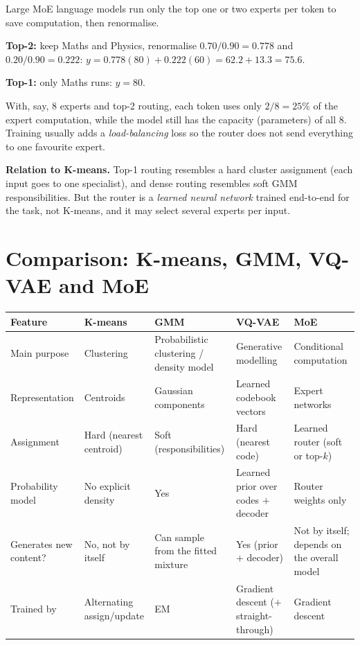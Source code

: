 \documentclass[11pt,a4paper]{article}
\begin{document}
\begin{example}
Large MoE language models run only the top one or two experts per token to save computation, then renormalise.

\textbf{Top-2:} keep Maths and Physics, renormalise $0.70/0.90=0.778$ and $0.20/0.90=0.222$:
$y=0.778(80)+0.222(60)=62.2+13.3=\mathbf{75.6}$.

\textbf{Top-1:} only Maths runs: $y=80$.

With, say, 8 experts and top-2 routing, each token uses only $2/8=25\%$ of the expert computation, while the model still has the capacity (parameters) of all 8. Training usually adds a \emph{load-balancing} loss so the router does not send everything to one favourite expert.
\end{example}

\textbf{Relation to K-means.} Top-1 routing resembles a hard cluster assignment (each input goes to one specialist), and dense routing resembles soft GMM responsibilities. But the router is a \emph{learned neural network} trained end-to-end for the task, not K-means, and it may select several experts per input.

\section{Comparison: K-means, GMM, VQ-VAE and MoE}

\begin{center}
\renewcommand{\arraystretch}{1.2}
\small
\begin{tabular}{@{}p{2.4cm}p{2.7cm}p{3cm}p{3.1cm}p{3.3cm}@{}}
\toprule
Feature & K-means & GMM & VQ-VAE & MoE\\
\midrule
Main purpose & Clustering & Probabilistic clustering / density model & Generative modelling & Conditional computation\\
Representation & Centroids & Gaussian components & Learned codebook vectors & Expert networks\\
Assignment & Hard (nearest centroid) & Soft (responsibilities) & Hard (nearest code) & Learned router (soft or top-$k$)\\
Probability model & No explicit density & Yes & Learned prior over codes $+$ decoder & Router weights only\\
Generates new content? & No, not by itself & Can sample from the fitted mixture & Yes (prior $+$ decoder) & Not by itself; depends on the overall model\\
Trained by & Alternating assign/update & EM & Gradient descent ($+$ straight-through) & Gradient descent\\
\bottomrule
\end{tabular}
\end{center}
\end{document}
